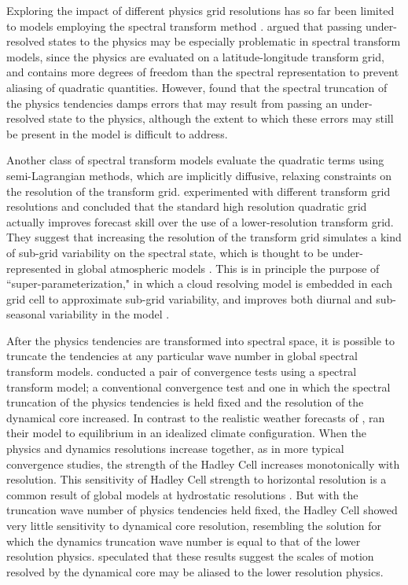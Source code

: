 \documentclass{agujournal}
\begin{document}
Exploring the impact of different physics grid resolutions has so far been limited to models employing the spectral transform method \citep{LH1997MWR,W1999T,W2014PTRSL}. \cite{LH1997MWR} argued that passing under-resolved states to the physics may be especially problematic in spectral transform models, since the physics are evaluated on a latitude-longitude transform grid, and contains more degrees of freedom than the spectral representation to prevent aliasing of quadratic quantities. However, \cite{LH1997MWR} found that the spectral truncation of the physics tendencies damps errors that may result from passing an under-resolved state to the physics, although the extent to which these errors may still be present in the model is difficult to address. 

Another class of spectral transform models evaluate the quadratic terms using semi-Lagrangian methods, which are implicitly diffusive, relaxing constraints on the resolution of the transform grid. \cite{W2014PTRSL} experimented with different transform grid resolutions and concluded that the standard high resolution quadratic grid actually improves forecast skill over the use of a lower-resolution transform grid. They suggest that increasing the resolution of the transform grid simulates a kind of sub-grid variability on the spectral state, which is thought to be under-represented in global atmospheric models \citep{S2005QJR}. This is in principle the purpose of ``super-parameterization," in which a cloud resolving model is embedded in each grid cell to approximate sub-grid variability, and improves both diurnal and sub-seasonal variability in the model \citep{RKAG2003BAMS}.

After the physics tendencies are transformed into spectral space, it is possible to truncate the tendencies at any particular wave number in global spectral transform models. \cite{W1999T} conducted a pair of convergence tests using a spectral transform model; a conventional convergence test and one in which the spectral truncation of the physics tendencies is held fixed and the resolution of the dynamical core increased. In contrast to the realistic weather forecasts of \cite{W2014PTRSL}, \cite{W1999T} ran their model to equilibrium in an idealized climate configuration. When the physics and dynamics resolutions increase together, as in more typical convergence studies, the strength of the Hadley Cell increases monotonically with resolution. This sensitivity of Hadley Cell strength to horizontal resolution is a common result of global models at hydrostatic resolutions \citep[see][and references therein]{HR2017JCLIM}. But with the truncation wave number of physics tendencies held fixed, the Hadley Cell showed very little sensitivity to dynamical core resolution, resembling the solution for which the dynamics truncation wave number is equal to that of the lower resolution physics. \cite{HR2017JCLIM} speculated that these results suggest the scales of motion resolved by the dynamical core may be aliased to the lower resolution physics.
\end{document}
